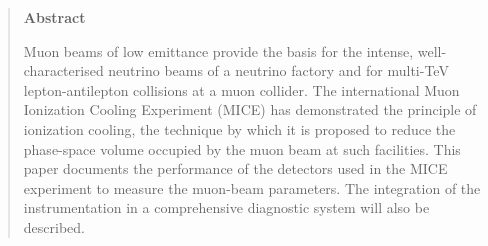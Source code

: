 \begin{quotation}
\begin{center}
\textbf{Abstract}
\end{center}

\noindent
Muon beams of low emittance provide the basis for the intense,
well-characterised neutrino beams of a neutrino factory and for
multi-TeV lepton-antilepton collisions at a muon collider.
The international Muon Ionization Cooling Experiment (MICE) has
demonstrated the principle of ionization cooling, the technique by
which it is proposed to reduce the phase-space volume occupied by the
muon beam at such facilities. 
This paper documents the performance of the detectors used in the MICE
experiment to measure the muon-beam parameters.
The integration of the instrumentation in a comprehensive diagnostic
system will also be described.

\end{quotation}